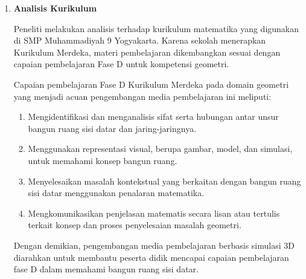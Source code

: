 \begin{enumerate}[leftmargin=1cm, label=\arabic*.]
\begin{enumerate}[label=\textbf{\alph*.}]
        \item \textbf{Analisis Kurikulum}
        
        \hspace*{1cm}Peneliti melakukan analisis terhadap kurikulum matematika yang digunakan di SMP Muhammadiyah 9 Yogyakarta. Karena sekolah menerapkan Kurikulum Merdeka, materi pembelajaran dikembangkan sesuai dengan capaian pembelajaran Fase D untuk kompetensi geometri.

        \hspace*{1cm}Capaian pembelajaran Fase D Kurikulum Merdeka pada domain geometri yang menjadi acuan pengembangan media pembelajaran ini meliputi:
        \begin{enumerate}[label=\alph*)]
            \item Mengidentifikasi dan menganalisis sifat serta hubungan antar unsur bangun ruang sisi datar dan jaring-jaringnya.
            \item Menggunakan representasi visual, berupa gambar, model, dan simulasi, untuk memahami konsep bangun ruang.
            \item Menyelesaikan masalah kontekstual yang berkaitan dengan bangun ruang sisi datar menggunakan penalaran matematika.
            \item Mengkomunikasikan penjelasan matematis secara lisan atau tertulis terkait konsep dan proses penyelesaian masalah geometri.
        \end{enumerate}

        \hspace*{1cm}Dengan demikian, pengembangan media pembelajaran berbasis simulasi 3D diarahkan untuk membantu peserta didik mencapai capaian pembelajaran fase D dalam memahami bangun ruang sisi datar.
    \end{enumerate}


\end{enumerate}
